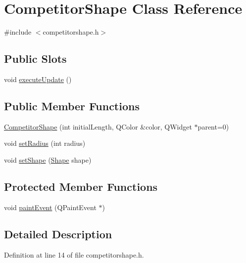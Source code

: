 \hypertarget{class_competitor_shape}{
\section{CompetitorShape Class Reference}
\label{class_competitor_shape}
}


{\ttfamily \#include $<$competitorshape.h$>$}

\subsection*{Public Slots}
\begin{DoxyCompactItemize}
\item 
void \hyperlink{class_competitor_shape_a31047bfe507825f68a8be6f0e049f24d}{executeUpdate} ()
\end{DoxyCompactItemize}
\subsection*{Public Member Functions}
\begin{DoxyCompactItemize}
\item 
\hyperlink{class_competitor_shape_a14c22d71983b4af0ff1a5c79d9a09f26}{CompetitorShape} (int initialLength, QColor \&color, QWidget $\ast$parent=0)
\item 
void \hyperlink{class_competitor_shape_aaf524721fabe4ea41932e0e6f0f7fa40}{setRadius} (int radius)
\item 
void \hyperlink{class_competitor_shape_a76059e0a7e097e44d1fa29c8cdb9ff80}{setShape} (\hyperlink{competitorshape_8h_a55b506070847a13554f8b879c1bfb37c}{Shape} shape)
\end{DoxyCompactItemize}
\subsection*{Protected Member Functions}
\begin{DoxyCompactItemize}
\item 
void \hyperlink{class_competitor_shape_a6500304e1d7e51046e3852b4a04dcbe4}{paintEvent} (QPaintEvent $\ast$)
\end{DoxyCompactItemize}


\subsection{Detailed Description}


Definition at line 14 of file competitorshape.h.



